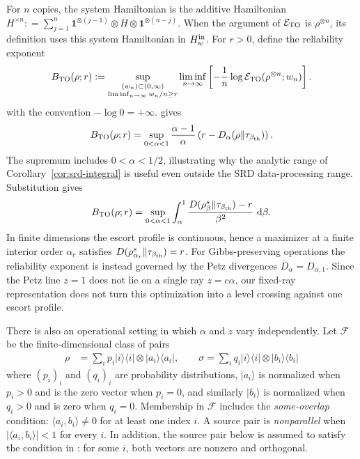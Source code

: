 \documentclass[12pt]{article}
\numberwithin{equation}{section}
\theoremstyle{definition}
\theoremstyle{remark}
\newcommand{\one}{\mathbf 1}
\newcommand{\dd}{\,\mathrm d}
\newcommand{\?}{\overset{?}{=}}
\newcommand{\defeq}{\mathrel{\mathop:}=}
\begin{document}
For $n$ copies, the system Hamiltonian is the additive Hamiltonian
$H^{\times n}\defeq\sum_{j=1}^n
\one^{\otimes(j-1)}\otimes H\otimes\one^{\otimes(n-j)}$.
When the argument of $\mathcal E_{\rm TO}$ is $\rho^{\otimes n}$, its
definition uses this system Hamiltonian in $H_w^{\rm in}$.
For $r>0$, define the reliability exponent
\begin{equation}
  B_{\rm TO}(\rho;r)
  \defeq \sup_{\substack{(w_n)\subset(0,\infty)\\
                         \liminf_{n\to\infty}w_n/n\geq r}}
  \liminf_{n\to\infty}
  \left[-\frac1n\log
  \mathcal E_{\rm TO}(\rho^{\otimes n};w_n)\right].
  \label{eq:work-reliability-definition}
\end{equation}
with the convention $-\log0=+\infty$.
\cite[Theorem~2]{Watanabe:2026pzw} gives
\begin{equation}
  B_{\rm TO}(\rho;r)
  =\sup_{0<\alpha<1}
   \frac{\alpha-1}{\alpha}
   \left(r-D_\alpha(\rho\Vert\tau_{\beta_{\rm th}})\right).
  \label{eq:work-reliability-renyi}
\end{equation}
The supremum includes $0<\alpha<1/2$, illustrating why the analytic range
of Corollary~\ref{cor:srd-integral} is useful even outside the SRD
data-processing range.  Substitution gives
\begin{equation}
  B_{\rm TO}(\rho;r)
  =\sup_{0<\alpha<1}
   \int_\alpha^1
   \frac{D(\rho_\beta^s\Vert\tau_{\beta_{\rm th}})-r}{\beta^2}
   \,\dd\beta .
  \label{eq:work-reliability-area}
\end{equation}
In finite dimensions the escort profile is continuous, hence a maximizer
at a finite interior order $\alpha_r$ satisfies
$D(\rho_{\alpha_r}^s\Vert\tau_{\beta_{\rm th}})=r$.
For Gibbs-preserving operations the reliability exponent is instead
governed by the Petz divergences
\(\overline D_\alpha=D_{\alpha,1}\).  Since the Petz line \(z=1\)
does not lie on a single ray \(z=c\alpha\), our fixed-ray
representation does not turn this optimization into a level crossing
against one escort profile.

There is also an operational setting in which $\alpha$ and $z$ vary
independently.  Let $\mathcal F$ be the finite-dimensional class of pairs
\begin{align}
  \rho&=\sum_i p_i\lvert i\rangle\!\langle i\rvert
      \otimes\lvert a_i\rangle\!\langle a_i\rvert, \qquad
  \sigma=\sum_i q_i\lvert i\rangle\!\langle i\rvert
      \otimes\lvert b_i\rangle\!\langle b_i\rvert
  \label{eq:flat-pair-class}
\end{align}
where $(p_i)_i$ and $(q_i)_i$ are probability distributions,
$|a_i\rangle$ is normalized when $p_i>0$ and is the zero vector when
$p_i=0$, and similarly $|b_i\rangle$ is normalized when $q_i>0$ and is
zero when $q_i=0$.  Membership in $\mathcal F$ includes the
\emph{some-overlap} condition: $\langle a_i,b_i\rangle\neq0$ for at least
one index $i$.  A source pair is \emph{nonparallel} when
$|\langle a_i,b_i\rangle|<1$ for every $i$.  In addition, the source pair
below is assumed to satisfy the condition in \cite[eq.~(14)]{Verhagen:2025anx}:
for some $i$, both vectors are nonzero and orthogonal.
\end{document}
